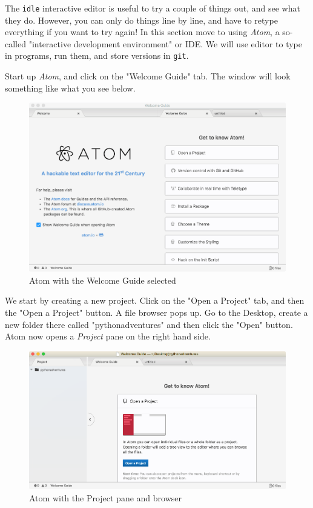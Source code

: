 The \texttt{idle} interactive editor is useful to try a couple of things out, and see what they do. However, you can only do things line by line, and have to retype everything if you want to try again! In this section move to using \textit{Atom}, a so-called "interactive development environment" or IDE. We will use editor to type in programs, run them, and store versions in \texttt{git}.

Start up \textit{Atom}, and click on the "Welcome Guide" tab. The window will look something like what you see below. 

\begin{figure}[h]
\centerline{\includegraphics[scale=.2]{images/p1ch1-atomwelcome.png}}
\caption{Atom with the Welcome Guide selected}
\end{figure}

We start by creating a new project. Click on the "Open a Project" tab, and then the "Open a Project" button. A file browser pops up. Go to the Desktop, create a new folder there called "pythonadventures" and then click the "Open" button. Atom now opens a \textit{Project} pane on the right hand side. 

\begin{figure}[h]
\centerline{\includegraphics[scale=.20]{images/p1ch1-projectbrowser.png}}
\caption{Atom with the Project pane and browser}
\end{figure}


